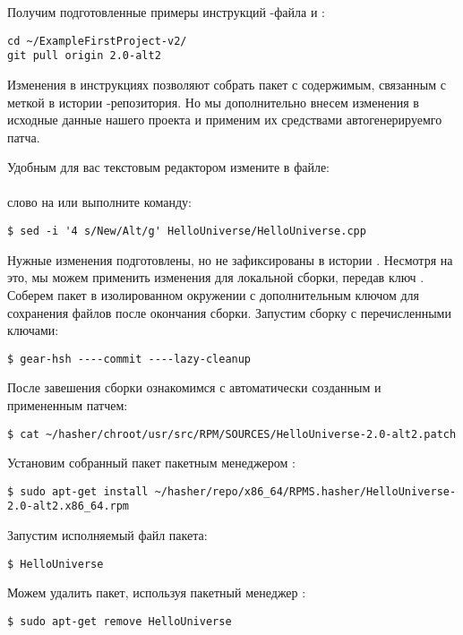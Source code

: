Получим подготовленные примеры инструкций -файла и :

\begin{verbatim}
cd ~/ExampleFirstProject-v2/
git pull origin 2.0-alt2
\end{verbatim}

Изменения в инструкциях позволяют собрать пакет с содержимым, связанным с меткой
 в истории -репозитория. Но мы дополнительно внесем изменения
в исходные данные нашего проекта и применим их средствами автогенерируемго патча.

Удобным для вас текстовым редактором измените в файле:\\
\\
слово  на  или выполните команду:
\begin{verbatim}
$ sed -i '4 s/New/Alt/g' HelloUniverse/HelloUniverse.cpp
\end{verbatim}

Нужные изменения подготовлены, но не зафиксированы в истории . Несмотря на это,
мы можем применить изменения для локальной сборки, передав  ключ .
Соберем пакет в изолированном окружении с  дополнительным ключом  для
сохранения файлов после окончания сборки.
Запустим сборку с перечисленными ключами:
\begin{verbatim}
$ gear-hsh ----commit ----lazy-cleanup
\end{verbatim}

После завешения сборки ознакомимся с автоматически созданным и примененным патчем:
\begin{verbatim}
$ cat ~/hasher/chroot/usr/src/RPM/SOURCES/HelloUniverse-2.0-alt2.patch
\end{verbatim}

Установим  собранный пакет пакетным менеджером :
\begin{verbatim}
$ sudo apt-get install ~/hasher/repo/x86_64/RPMS.hasher/HelloUniverse-2.0-alt2.x86_64.rpm
\end{verbatim}

Запустим исполняемый файл пакета:
\begin{verbatim}
$ HelloUniverse
\end{verbatim}

Можем удалить пакет, используя пакетный менеджер :
\begin{verbatim}
$ sudo apt-get remove HelloUniverse
\end{verbatim}

